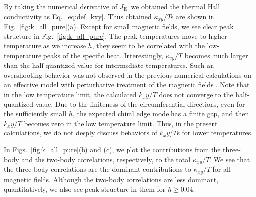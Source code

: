 \documentclass[reprint,amsmath,amssymb,aps,prx]{revtex4-2}
\begin{document}
By taking the numerical derivative of $J_{\mathrm{E}}$, we obtained the thermal Hall conductivity as Eq.~\ref{eq:def_kxy}. Thus obtained $\kappa_{xy}/T$s are shown in Fig.~\ref{fig:k_all_pure}(a). Except for small magnetic fields, we see clear peak structure in Fig.~\ref{fig:k_all_pure}. The peak temperatures move to higher temperature as we increase $h$, they seem to be correlated with the low-temperature peaks of the specific heat. Interestingly, $\kappa_{xy}/T$ becomes much larger than the half-quantized value for intermediate temperatures. Such an overshooting behavior was not observed in the previous numerical calculations on an effective model with perturbative treatment of the magnetic fields \cite{NasuYM2017}. Note that in the low temperature limit, the calculated $k_xy/T$ does not converge to the half-quantized value. Due to the finiteness of the circumferential directions, even for the sufficiently small $h$, the expected chiral edge mode has a finite gap, and then $k_xy/T$ becomes zero in the low temperature limit. Thus, in the present calculations, we do not deeply discuss behaviors of $k_xy/T$s for lower temperatures. 

In Figs.~\ref{fig:k_all_pure}(b) and (c), we plot the contributions from the three-body and the two-body correlations, respectively, to the total $\kappa_{xy}/T$. We see that the three-body correlations are the dominant contributions to $\kappa_{xy}/T$ for all magnetic fields. Although the two-body correlations are less dominant, quantitatively, we also see peak structure in them for $h \ge 0.04$.
\end{document}
